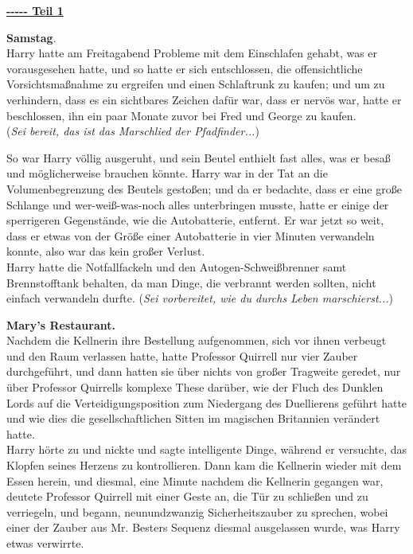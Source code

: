 

\hypertarget{teil-1}{%

\textbf{\uline{-\/-\/-\/-\/- Teil 1}}

\hfill\break \textbf{Samstag}.\\ Harry hatte am Freitagabend Probleme mit dem Einschlafen gehabt, was er vorausgesehen hatte, und so hatte er sich entschlossen, die offensichtliche Vorsichtsmaßnahme zu ergreifen und einen Schlaftrunk zu kaufen; und um zu verhindern, dass es ein sichtbares Zeichen dafür war, dass er nervös war, hatte er beschlossen, ihn ein paar Monate zuvor bei Fred und George zu kaufen.\\ (\emph{Sei bereit, das ist das Marschlied der Pfadfinder...})

So war Harry völlig ausgeruht, und sein Beutel enthielt fast alles, was er besaß und möglicherweise brauchen könnte. Harry war in der Tat an die Volumenbegrenzung des Beutels gestoßen; und da er bedachte, dass er eine große Schlange und wer-weiß-was-noch alles unterbringen musste, hatte er einige der sperrigeren Gegenstände, wie die Autobatterie, entfernt. Er war jetzt so weit, dass er etwas von der Größe einer Autobatterie in vier Minuten verwandeln konnte, also war das kein großer Verlust.\\ Harry hatte die Notfallfackeln und den Autogen-Schweißbrenner samt Brennstofftank behalten, da man Dinge, die verbrannt werden sollten, nicht einfach verwandeln durfte. (\emph{Sei vorbereitet, wie du durchs Leben marschierst...})

\textbf{Mary's Restaurant.}\\ Nachdem die Kellnerin ihre Bestellung aufgenommen, sich vor ihnen verbeugt und den Raum verlassen hatte, hatte Professor Quirrell nur vier Zauber durchgeführt, und dann hatten sie über nichts von großer Tragweite geredet, nur über Professor Quirrells komplexe These darüber, wie der Fluch des Dunklen Lords auf die Verteidigungsposition zum Niedergang des Duellierens geführt hatte und wie dies die gesellschaftlichen Sitten im magischen Britannien verändert hatte.\\ Harry hörte zu und nickte und sagte intelligente Dinge, während er versuchte, das Klopfen seines Herzens zu kontrollieren. Dann kam die Kellnerin wieder mit dem Essen herein, und diesmal, eine Minute nachdem die Kellnerin gegangen war, deutete Professor Quirrell mit einer Geste an, die Tür zu schließen und zu verriegeln, und begann, neunundzwanzig Sicherheitszauber zu sprechen, wobei einer der Zauber aus Mr. Besters Sequenz diesmal ausgelassen wurde, was Harry etwas verwirrte.

}
